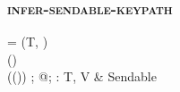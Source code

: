 \subsubsection{\textsc{infer-sendable-keypath}}

  { = (T, ) \\
   \neg\hasIsolatedKeyPathComponent() \\
   \isAllSendable(())}
  {\Gamma;\; @\kappa;\; \alpha \vdash {} : \; \langle T, V\rangle\; \&\; \textsf{Sendable} \at \mathunderscore \dashv \Gamma}
